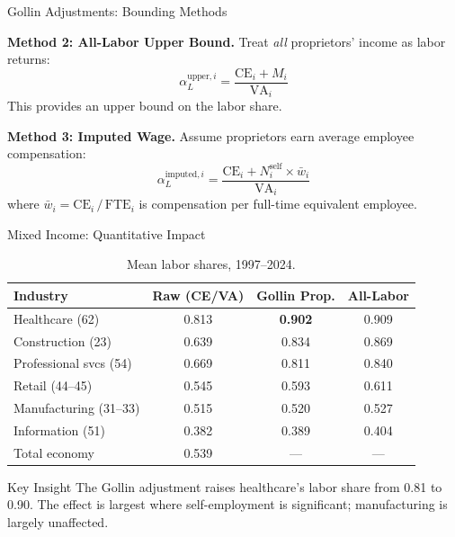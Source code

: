 \begin{frame}{Gollin Adjustments: Bounding Methods}

\textbf{Method 2: All-Labor Upper Bound.}
Treat \emph{all} proprietors' income as labor returns:
\begin{equation*}
    \alpha_L^{\text{upper},i} = \frac{\text{CE}_i + M_i}{\text{VA}_i}
\end{equation*}
This provides an upper bound on the labor share.

\medskip

\textbf{Method 3: Imputed Wage.}
Assume proprietors earn average employee compensation:
\begin{equation*}
    \alpha_L^{\text{imputed},i} = \frac{\text{CE}_i + N_i^{\text{self}} \times \bar{w}_i}{\text{VA}_i}
\end{equation*}
where $\bar{w}_i = \text{CE}_i \,/\, \text{FTE}_i$ is compensation per full-time equivalent employee.

\end{frame}

\begin{frame}{Mixed Income: Quantitative Impact}

\begin{table}
\centering
\footnotesize
\begin{tabular}{lccc}
\toprule
Industry & Raw (CE/VA) & Gollin Prop. & All-Labor \\
\midrule
Healthcare (62) & 0.813 & \textbf{0.902} & 0.909 \\
Construction (23) & 0.639 & 0.834 & 0.869 \\
Professional svcs (54) & 0.669 & 0.811 & 0.840 \\
Retail (44--45) & 0.545 & 0.593 & 0.611 \\
Manufacturing (31--33) & 0.515 & 0.520 & 0.527 \\
Information (51) & 0.382 & 0.389 & 0.404 \\
\midrule
Total economy & 0.539 & --- & --- \\
\bottomrule
\end{tabular}
\caption*{\footnotesize Mean labor shares, 1997--2024.}
\end{table}

\vspace{-6pt}
\begin{alertblock}{Key Insight}
The Gollin adjustment raises healthcare's labor share from 0.81 to 0.90. The effect is largest where self-employment is significant; manufacturing is largely unaffected.
\end{alertblock}

\end{frame}

